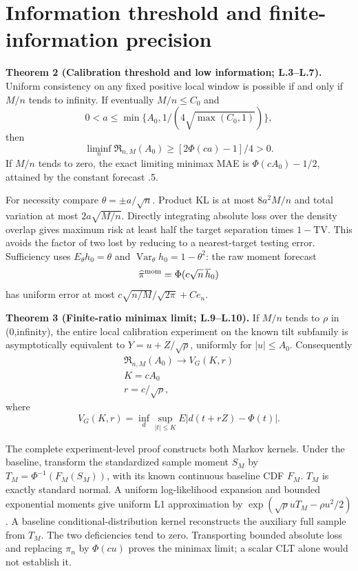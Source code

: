 \section{Information threshold and finite-information precision}\label{information-threshold-and-finite-information-precision}

\textbf{Theorem 2 (Calibration threshold and low information; L.3--L.7).} Uniform consistency on any fixed positive local window is possible if and only if \(M/n\) tends to infinity. If eventually \(M/n\le C_0\) and
\[
0<a\le\min\{A_0,1/(4\sqrt{\max(C_0,1)})\},
\]
then
\[
\liminf_n\mathfrak R_{n,M}(A_0)\ge[2\Phi(ca)-1]/4>0.
\]
If \(M/n\) tends to zero, the exact limiting minimax MAE is \(\Phi(cA_0)-1/2\), attained by the constant forecast .5.

For necessity compare \(\theta=\pm a/\sqrt n\). Product KL is at most \(8a^2M/n\) and total variation at most \(2a\sqrt{M/n}\). Directly integrating absolute loss over the density overlap gives maximum risk at least half the target separation times \(1-\mathrm{TV}\). This avoids the factor of two lost by reducing to a nearest-target testing error. Sufficiency uses \(E_\theta h_0=\theta\) and \(\operatorname{Var}_\theta h_0=1-\theta^2\): the raw moment forecast
\[
\widehat\pi^{\rm mom}=\Phi(c\sqrt n\,\overline h_0)
\]
has uniform error at most \(c\sqrt{n/M}/\sqrt{2\pi}+Ce_n\).

\textbf{Theorem 3 (Finite-ratio minimax limit; L.9--L.10).} If \(M/n\) tends to \(\rho\) in (0,infinity), the entire local calibration experiment on the known tilt subfamily is asymptotically equivalent to \(Y=u+Z/\sqrt\rho\), uniformly for \(|u|\le A_0\). Consequently
\[
\begin{gathered}
\mathfrak R_{n,M}(A_0)\longrightarrow V_G(K,r) \\
K=cA_0 \\
r=c/\sqrt\rho,
\end{gathered}
\]
where
\[
V_G(K,r)=\inf_d\sup_{|t|\le K}E|d(t+rZ)-\Phi(t)|.
\]

The complete experiment-level proof constructs both Markov kernels. Under the baseline, transform the standardized sample moment \(S_M\) by \(T_M=\Phi^{-1}(F_M(S_M))\), with its known continuous baseline CDF \(F_M\). \(T_M\) is exactly standard normal. A uniform log-likelihood expansion and bounded exponential moments give uniform L1 approximation by \(\exp(\sqrt\rho uT_M-\rho u^2/2)\). A baseline conditional-distribution kernel reconstructs the auxiliary full sample from \(T_M\). The two deficiencies tend to zero. Transporting bounded absolute loss and replacing \(\pi_n\) by \(\Phi(cu)\) proves the minimax limit; a scalar CLT alone would not establish it.

